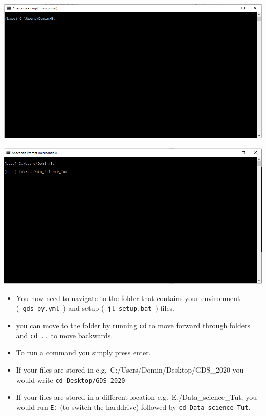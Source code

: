 \documentclass[
]{book}
\begin{document}
\begin{center}\includegraphics[width=13.65in]{figs/chp4/Conda_2} \end{center}

\begin{center}\includegraphics[width=13.6in]{figs/chp4/Conda_3} \end{center}

\begin{itemize}
\item
  You now need to navigate to the folder that contains your environment (\texttt{\_gds\_py.yml\_}) and setup (\texttt{\_jl\_setup.bat\_}) files.
\item
  you can move to the folder by running \texttt{cd} to move forward through folders and \texttt{cd\ ..} to move backwards.
\item
  To run a command you simply press enter.
\item
  If your files are stored in e.g.~C:/Users/Domin/Desktop/GDS\_2020 you would write \texttt{cd\ Desktop/GDS\_2020}
\item
  If your files are stored in a different location e.g.~E:/Data\_science\_Tut, you would run \texttt{E:}
  (to switch the harddrive) followed by \texttt{cd\ Data\_science\_Tut}.
\end{itemize}
\end{document}
